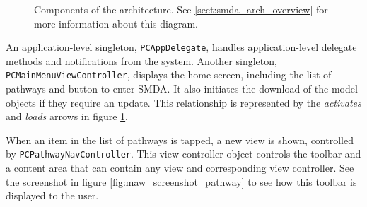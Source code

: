 \begin{figure}[p]
    \caption{\label{fig:maw_components} Components of the architecture. See
    \ref{sect:smda_arch_overview} for more information about this diagram.}
\end{figure}

An application-level singleton, \texttt{PCAppDelegate}, handles
application-level delegate methods and notifications from the system. Another
singleton, \texttt{PCMainMenuViewController}, displays the home screen,
including the list of pathways and button to enter SMDA. It also initiates the
download of the model objects if they require an update. This relationship is
represented by the \emph{activates} and \emph{loads} arrows in figure
\ref{fig:maw_components}.

When an item in the list of pathways is tapped, a new view is shown, controlled
by \texttt{PCPathwayNavController}. This view controller object controls the
toolbar and a content area that can contain any view and corresponding view
controller. See the screenshot in figure \ref{fig:maw_screenshot_pathway} to see
how this toolbar is displayed to the user.

